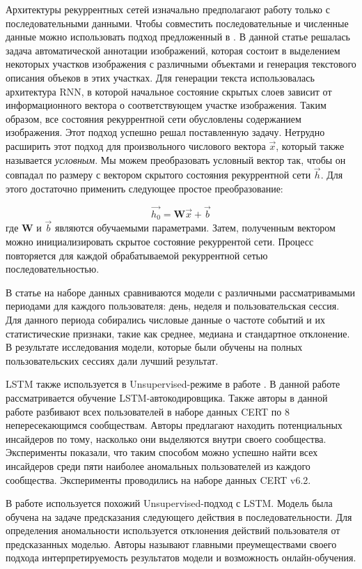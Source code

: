 Архитектуры рекуррентных сетей изначально предполагают работу только с последовательными данными. Чтобы совместить последовательные и численные данные можно использовать подход предложенный в \cite{karpathyDeepVisualSemanticAlignments2015}. В данной статье решалась задача автоматической аннотации изображений, которая состоит в выделением некоторых участков изображения с различными объектами и генерация текстового описания объеков в этих участках. Для генерации текста использовалась архитектура RNN, в которой начальное состояние скрытых слоев зависит от информационного вектора о соответствующем участке изображения. Таким образом, все состояния рекуррентной сети обусловлены содержанием изображения. Этот подход успешно решал поставленную задачу.
Нетрудно расширить этот подход для произвольного числового вектора $\overrightarrow{x}$, который также называется \textit{условным}. Мы можем преобразовать условный вектор так, чтобы он совпадал по размеру с вектором скрытого состояния рекуррентной сети $\overrightarrow{h}$. Для этого достаточно применить следующее простое преобразование:

$$\overrightarrow{h_0} = \mathbf{W}\overrightarrow{x} + \overrightarrow{b}$$
где $\mathbf{W}$ и $\overrightarrow{b}$ являются обучаемыми параметрами. Затем, полученным вектором можно инициализировать скрытое состояние рекуррентой сети. Процесс повторяется для каждой обрабатываемой рекуррентной сетью последовательностью.

В статье \cite{leAnalyzingDataGranularity2020b} на наборе данных сравниваются модели с различными рассматривамыми периодами для каждого пользователя: день, неделя и пользовательская сессия. Для данного периода собирались числовые данные о частоте событий и их статистические признаки, такие как среднее, медиана и стандартное отклонение. В результате исследования модели, которые были обучены на полных пользовательских сессиях дали лучший результат.

LSTM также используется в Unsupervised-режиме в работе \cite{paulLACLSTMAUTOENCODER}. В данной работе рассматривается обучение LSTM-автокодировщика. Также авторы в данной работе разбивают всех пользователей в наборе данных CERT по 8 непересекающимся сообществам. Авторы предлагают находить потенциальных инсайдеров по тому, насколько они выделяются внутри своего сообщества. Эксперименты показали, что таким способом можно успешно найти всех инсайдеров среди пяти наиболее аномальных пользователей из каждого сообщества. Эксперименты проводились на наборе данных CERT v6.2.

В работе \cite{tuorDeepLearningUnsupervised2017} используется похожий Unsupervised-подход с LSTM. Модель была обучена на задаче предсказания следующего действия в последовательности. Для определения аномальности используется отклонения действий пользователя от предсказанных моделью. Авторы называют главными преумеществами своего подхода интерпретируемость результатов модели и возможность онлайн-обучения.